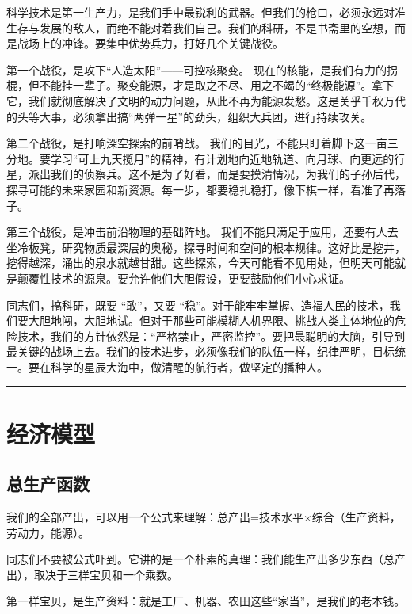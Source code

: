 科学技术是第一生产力，是我们手中最锐利的武器。但我们的枪口，必须永远对准生存与发展的敌人，而绝不能对着我们自己。我们的科研，不是书斋里的空想，而是战场上的冲锋。要集中优势兵力，打好几个关键战役。

第一个战役，是攻下``人造太阳''------可控核聚变。 现在的核能，是我们有力的拐棍，但不能挂一辈子。聚变能源，才是取之不尽、用之不竭的``终极能源''。拿下它，我们就彻底解决了文明的动力问题，从此不再为能源发愁。这是关乎千秋万代的头等大事，必须拿出搞``两弹一星''的劲头，组织大兵团，进行持续攻关。

第二个战役，是打响深空探索的前哨战。 我们的目光，不能只盯着脚下这一亩三分地。要学习``可上九天揽月''的精神，有计划地向近地轨道、向月球、向更远的行星，派出我们的侦察兵。这不是为了好看，而是要摸清情况，为我们的子孙后代，探寻可能的未来家园和新资源。每一步，都要稳扎稳打，像下棋一样，看准了再落子。

第三个战役，是冲击前沿物理的基础阵地。 我们不能只满足于应用，还要有人去坐冷板凳，研究物质最深层的奥秘，探寻时间和空间的根本规律。这好比是挖井，挖得越深，涌出的泉水就越甘甜。这些探索，今天可能看不见用处，但明天可能就是颠覆性技术的源泉。要允许他们大胆假设，更要鼓励他们小心求证。

同志们，搞科研，既要 ``敢''，又要 ``稳''。对于能牢牢掌握、造福人民的技术，我们要大胆地闯，大胆地试。但对于那些可能模糊人机界限、挑战人类主体地位的危险技术，我们的方针依然是：``严格禁止，严密监控''。要把最聪明的大脑，引导到最关键的战场上去。我们的技术进步，必须像我们的队伍一样，纪律严明，目标统一。要在科学的星辰大海中，做清醒的航行者，做坚定的播种人。

\begin{center}\rule{0.5\linewidth}{0.5pt}\end{center}

\section{经济模型}\label{ux7ecfux6d4eux6a21ux578b}

\subsection{总生产函数}\label{ux603bux751fux4ea7ux51fdux6570}

我们的全部产出，可以用一个公式来理解：总产出=技术水平×综合（生产资料，劳动力，能源）。

同志们不要被公式吓到。它讲的是一个朴素的真理：我们能生产出多少东西（总产出），取决于三样宝贝和一个乘数。

第一样宝贝，是生产资料：就是工厂、机器、农田这些``家当''，是我们的老本钱。

